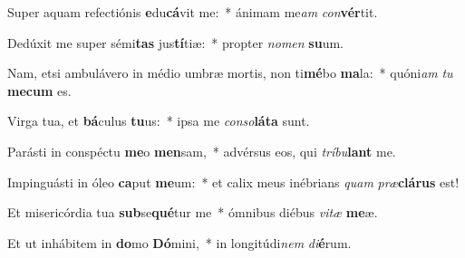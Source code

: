 \item Super aquam refectiónis \textbf{e}du\textbf{cá}vit me:~* ánimam me\textit{am} \textit{con}\textbf{vér}tit.
\item Dedúxit me super sémi\textbf{tas} jus\textbf{tí}tiæ:~* propter \textit{no}\textit{men} \textbf{su}um.
\item Nam, etsi ambulávero in médio umbræ mortis, non ti\textbf{mé}bo \textbf{ma}la:~* quóni\textit{am} \textit{tu} \textbf{me}\textbf{cum} es.
\item Virga tua, et \textbf{bá}culus \textbf{tu}us:~* ipsa me \textit{con}\textit{so}\textbf{lá}\textbf{ta} sunt.
\item Parásti in conspéctu \textbf{me}o \textbf{men}sam,~* advérsus eos, qui \textit{trí}\textit{bu}\textbf{lant} me.
\item Impinguásti in óleo \textbf{ca}put \textbf{me}um:~* et calix meus inébrians \textit{quam} \textit{præ}\textbf{clá}\textbf{rus} est!
\item Et misericórdia tua \textbf{sub}se\textbf{qué}tur me~* ómnibus diébus \textit{vi}\textit{tæ} \textbf{me}æ.
\item Et ut inhábitem in \textbf{do}mo \textbf{Dó}mini,~* in longitúdi\textit{nem} \textit{di}\textbf{é}rum.
